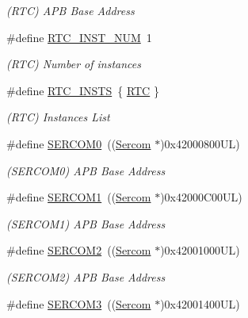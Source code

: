 \begin{DoxyCompactItemize}
\begin{DoxyCompactList}\small\item\em (R\+TC) A\+PB Base Address \end{DoxyCompactList}\item 
\#define \mbox{\hyperlink{group___s_a_m_d21_e15_l__base_gaa60e91b52e1886f06e68901250d0f7ff}{R\+T\+C\+\_\+\+I\+N\+S\+T\+\_\+\+N\+UM}}~1
\begin{DoxyCompactList}\small\item\em (R\+TC) Number of instances \end{DoxyCompactList}\item 
\#define \mbox{\hyperlink{group___s_a_m_d21_e15_l__base_gadf318081bc13d8cc65280fb772db8ba7}{R\+T\+C\+\_\+\+I\+N\+S\+TS}}~\{ \mbox{\hyperlink{group___s_a_m_d21_j18_a__base_ga5359a088f5d8b20ce74d920e46059304}{R\+TC}} \}
\begin{DoxyCompactList}\small\item\em (R\+TC) Instances List \end{DoxyCompactList}\item 
\#define \mbox{\hyperlink{group___s_a_m_d21_e15_l__base_gae5473788457bad0e69ad9d7f22ed404f}{S\+E\+R\+C\+O\+M0}}~((\mbox{\hyperlink{union_sercom}{Sercom}}   $\ast$)0x42000800\+U\+L)
\begin{DoxyCompactList}\small\item\em (S\+E\+R\+C\+O\+M0) A\+PB Base Address \end{DoxyCompactList}\item 
\#define \mbox{\hyperlink{group___s_a_m_d21_e15_l__base_ga130d7d7bc9ef1da1ba1bd094b42449d7}{S\+E\+R\+C\+O\+M1}}~((\mbox{\hyperlink{union_sercom}{Sercom}}   $\ast$)0x42000\+C00\+U\+L)
\begin{DoxyCompactList}\small\item\em (S\+E\+R\+C\+O\+M1) A\+PB Base Address \end{DoxyCompactList}\item 
\#define \mbox{\hyperlink{group___s_a_m_d21_e15_l__base_ga918e4c85993961a115bb23b4bb73a87f}{S\+E\+R\+C\+O\+M2}}~((\mbox{\hyperlink{union_sercom}{Sercom}}   $\ast$)0x42001000\+U\+L)
\begin{DoxyCompactList}\small\item\em (S\+E\+R\+C\+O\+M2) A\+PB Base Address \end{DoxyCompactList}\item 
\#define \mbox{\hyperlink{group___s_a_m_d21_e15_l__base_gac9f8240be5a40b46cb09617323ebc7e3}{S\+E\+R\+C\+O\+M3}}~((\mbox{\hyperlink{union_sercom}{Sercom}}   $\ast$)0x42001400\+U\+L)

\end{DoxyCompactItemize}
